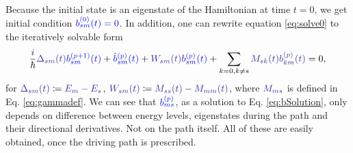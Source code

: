 Because the initial state is an eigenstate of the Hamiltonian at time $t=0$, we get initial condition $\blue{b_{sm}^{(0)}(t)=0}$. In addition, one can rewrite equation \ref{eq:solve0} to the iteratively solvable form
\begin{equation}
    \frac{i}{\hbar}\bluee{\Delta_{sm}(t)}\blue{b_{sm}^{(p+1)}(t)}+\blue{\dot b_{sm}^{(p)}(t)}+\bluee{W_{sm}(t)} \blue{b_{sm}^{(p)}(t)}+\sum_{k=0,k\neq s}\bluee{M_{sk}(t)}\bluee{b_{km}^{(p)}(t)}=0,
    \label{eq:bSolution}
\end{equation}
for $\bluee{\Delta_{sm}(t)}\coloneqq \bluee{E_m-E_s}$, $\bluee{W_{sm}(t)}\coloneqq \bluee{M_{ss}(t)}-\bluee{M_{mm}(t)}$, where $\bluee{M_{ms}}$ is defined in Eq. \ref{eq:gammadef}. We can see that $\blue{b_{ms}^{(p)}}$, as a solution to Eq. \ref{eq:bSolution}, only depends on difference between energy levels, eigenstates during the path and their directional derivatives. Not on the path itself. All of these are easily obtained, once the driving path is prescribed.




















